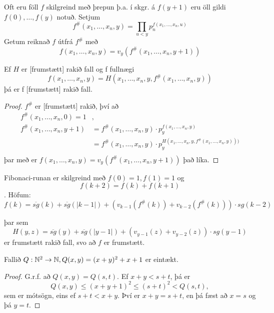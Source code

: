 \documentclass[12pt]{book}
\newcommand{\xxn}{x_1, \dotsc, x_n}
\begin{document}
Oft eru föll $f$ skilgreind með þrepun þ.a.
í skgr. á $f(y+1)$ eru öll gildi $f(0), \dotsc, f(y)$
notuð. Setjum
\[ f^{\#}(\xxn,y) = \prod_{u < y}p_n^{f(\xxn,u)} \]
Getum reiknað $f$ útfrá $f^{\#}$ með
\[ f(\xxn,y) = v_y (f^{\#}(\xxn,y+1)) \]

\begin{setn}
  Ef $H$ er [frumstætt] rakið fall og f fullnægi
  \[ f(\xxn, y) = H(\xxn,y, f^{\#}(\xxn,y))\]
  þá er f [frumstætt] rakið fall.
\end{setn}

\begin{proof}
  $f^{\#}$ er [frumstætt] rakið, því að
  \begin{align*}
    f^{\#}(\xxn,0) = 1& ,\\
    f^{\#}(\xxn,y+1) &= f^{\#}(\xxn,y) \cdot p_y^{f(\xxn,y)}\\
    &= f^{\#}(\xxn,y) \cdot p_y^{H(\xxn,y,f^{\#}(\xxn,y)))}\\
  \end{align*}
  þar með er $f(\xxn,y) = v_y(f^{\#}(\xxn,y+1))$ það líka.
\end{proof}

\begin{daemi}
  Fibonaci-runan er skilgreind með 
  $f(0) = 1, f(1) = 1$ og \[f(k+2) = f(k)+ f(k+1)\].
  Höfum:
  \[f(k) = \overline{sg}(k) + \overline{sg}(|k-1|) + (v_{k-1}(f^{\#}(k))+v_{k-2}(f^{\#}(k))) \cdot sg(k-2) \]

  þar sem  
  \[ H(y,z) =  \overline{sg}(y) + \overline{sg}(|y-1|) + (v_{y-1}(z) + v_{y-2}(z))\cdot sg(y-1)\]
  er frumstætt rakið fall, svo að $f$ er frumstætt.
\end{daemi}

\begin{setn}[Hjálparsetning]
  Fallið $Q: \mathbb{N}^2 \to \mathbb{N}, Q(x,y) = (x+y)^2 +x + 1$ er eintækt.
  \begin{proof}
    G.r.f. að $Q(x,y) = Q(s,t)$. Ef $x+y < s+t$, þá er
     \[ Q(x,y) \leq (x+y +1)^2 \leq (s+t)^2 < Q(s,t),\]
     sem er mótsögn, eins ef $s+t < x+y$. Því er $x+y = s+t$,
     en þá fæst að $x = s$ og þá $y = t$.
  \end{proof}
\end{setn}
\end{document}
